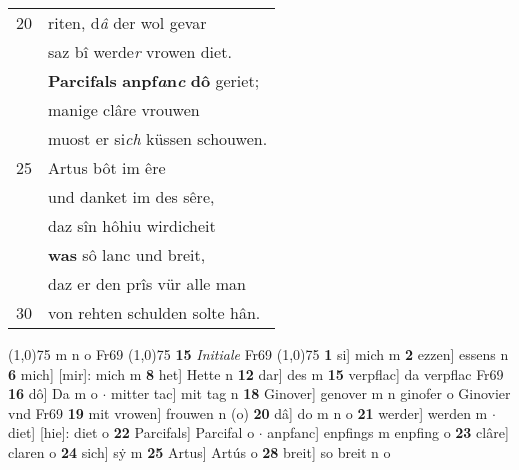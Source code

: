 \documentclass[8pt,a4paper,notitlepage]{article}
\begin{document}
\begin{table}[ht]
\begin{minipage}[t]{0.5\linewidth}
\begin{tabular}{rl}
20 & riten, d\textit{â} der wol gevar\\ 
 & saz bî werde\textit{r} vrowen diet.\\ 
 & \textbf{Parcifals} \textbf{anpf\textit{a}n\textit{c}} \textbf{dô} geriet;\\ 
 & manige clâre vrouwen\\ 
 & muost er si\textit{ch} küssen schouwen.\\ 
25 & Artus bôt im êre\\ 
 & und danket im des sêre,\\ 
 & daz sîn hôhiu wirdicheit\\ 
 & \textbf{was} sô lanc und breit,\\ 
 & daz er den prîs vür alle man\\ 
30 & von rehten schulden solte hân.\\ 
\end{tabular}
\scriptsize
\line(1,0){75} \newline
m n o Fr69 \newline
\line(1,0){75} \newline
\textbf{15} \textit{Initiale} Fr69  \newline
\line(1,0){75} \newline
\textbf{1} si] mich m \textbf{2} ezzen] essens n \textbf{6} mich] [mir]: mich m \textbf{8} het] Hette n \textbf{12} dar] des m \textbf{15} verpflac] da verpflac Fr69 \textbf{16} dô] Da m o  $\cdot$ mitter tac] mit tag n \textbf{18} Ginover] genover m n ginofer o Ginovier vnd Fr69 \textbf{19} mit vrowen] frouwen n (o) \textbf{20} dâ] do m n o \textbf{21} werder] werden m  $\cdot$ diet] [hie]: diet o \textbf{22} Parcifals] Parcifal o  $\cdot$ anpfanc] enpfings m enpfing o \textbf{23} clâre] claren o \textbf{24} sich] sẏ m \textbf{25} Artus] Artús o \textbf{28} breit] so breit n o \newline
\end{minipage}
\end{table}
\newpage
\end{document}
